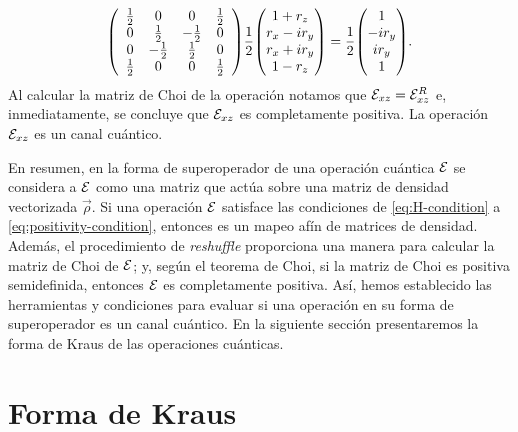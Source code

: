 \begin{align}
\mqty(
\begin{array}{cccc}
\frac{1}{2} & 0 & 0 & \frac{1}{2} \\
0 & \frac{1}{2} & -\frac{1}{2} & 0 \\
0 & -\frac{1}{2} & \frac{1}{2} & 0 \\
\frac{1}{2} & 0 & 0 & \frac{1}{2} \\
\end{array}
)
\frac{1}{2}
\mqty(
1+r_z\\r_x-ir_y\\r_x+ir_y\\1-r_z
)
=
\frac{1}{2}
\mqty(
1\\-ir_y\\ir_y\\1
).
\label{eq:QC-ex2-SR}
\end{align}
Al calcular la matriz de Choi de la operación notamos 
que $\mathcal{E}_{xz}=\mathcal{E}_{xz}^R$ e, inmediatamente, se concluye
que $\mathcal{E}_{xz}$ es completamente positiva. La operación $\mathcal{E}_{xz}$
es un canal cuántico.

En resumen, en la forma de superoperador de una operación cuántica $\mathcal{E}$
se considera a $\mathcal{E}$ como una matriz que actúa sobre 
una matriz de densidad vectorizada $\vec{\rho}$. 
Si una operación $\mathcal{E}$ satisface las condiciones de
\eqref{eq:H-condition} a \eqref{eq:positivity-condition}, entonces
es un mapeo afín de matrices de densidad.
Además, el procedimiento de \textit{reshuffle} 
proporciona una manera para calcular la matriz de Choi de
 $\mathcal{E}$; y, según el teorema de Choi, si 
la matriz de Choi es positiva semidefinida, entonces $\mathcal{E}$ es 
completamente positiva. 
Así, hemos establecido las herramientas y condiciones para evaluar 
si una operación en su forma de superoperador es un canal cuántico.
En la siguiente sección presentaremos la forma de Kraus de las operaciones
cuánticas.

\section{Forma de Kraus} %
 

